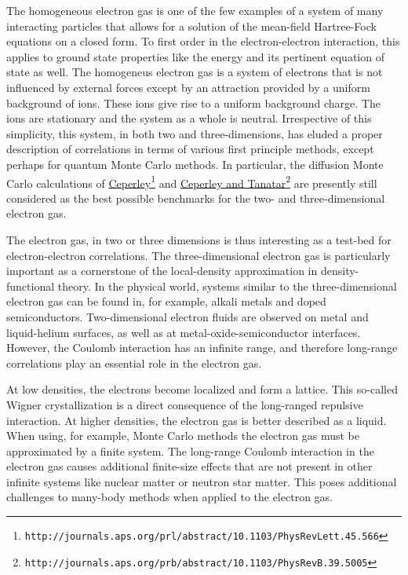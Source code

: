 \documentclass[graybox,sectrefs,envcountresetchap,open=right]{svmonodo}
\begin{document}
\noindent
The homogeneous electron gas is one of the few examples of a system of many
interacting particles that allows for a solution of the mean-field
Hartree-Fock equations on a closed form.  To first order in the
electron-electron interaction, this applies to ground state properties
like the energy and its pertinent equation of state as well.  The
homogeneus electron gas is a system of electrons that is not
influenced by external forces except by an attraction provided by a
uniform background of ions. These ions give rise to a uniform
background charge.  The ions are stationary and the system as a whole
is neutral.
Irrespective of this simplicity, this system, in both two and
three-dimensions, has eluded a proper description of correlations in
terms of various first principle methods, except perhaps for quantum
Monte Carlo methods. In particular, the diffusion Monte Carlo
calculations of \href{{http://journals.aps.org/prl/abstract/10.1103/PhysRevLett.45.566}}{Ceperley}\footnote{\texttt{http://journals.aps.org/prl/abstract/10.1103/PhysRevLett.45.566}} 
and \href{{http://journals.aps.org/prb/abstract/10.1103/PhysRevB.39.5005}}{Ceperley and Tanatar}\footnote{\texttt{http://journals.aps.org/prb/abstract/10.1103/PhysRevB.39.5005}} 
are presently still considered as the
best possible benchmarks for the two- and three-dimensional electron
gas. 



The electron gas, in 
two or three dimensions is thus interesting as a test-bed for 
electron-electron correlations. The three-dimensional 
electron gas is particularly important as a cornerstone 
of the local-density approximation in density-functional 
theory. In the physical world, systems 
similar to the three-dimensional electron gas can be 
found in, for example, alkali metals and doped 
semiconductors. Two-dimensional electron fluids are 
observed on metal and liquid-helium surfaces, as well as 
at metal-oxide-semiconductor interfaces. However, the Coulomb 
interaction has an infinite range, and therefore 
long-range correlations play an essential role in the
electron gas. 




At low densities, the electrons become 
localized and form a lattice. This so-called Wigner 
crystallization is a direct consequence 
of the long-ranged repulsive interaction. At higher
densities, the electron gas is better described as a
liquid.
When using, for example, Monte Carlo methods the electron gas must be approximated 
by a finite system. The long-range Coulomb interaction 
in the electron gas causes additional finite-size effects  that are not
present in other infinite systems like nuclear matter or neutron star matter.
This poses additional challenges to many-body methods when applied 
to the electron gas.
\end{document}
